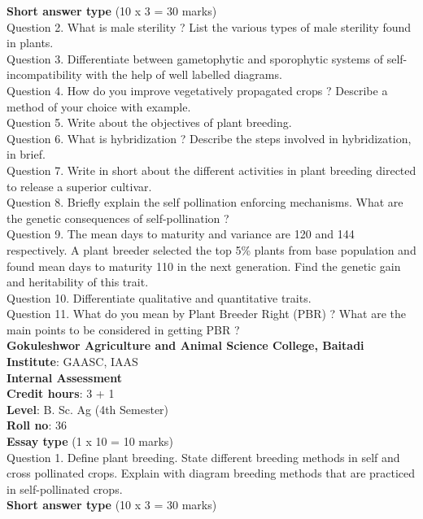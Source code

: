 \documentclass[12pt]{article}\usepackage[]{graphicx}\usepackage[]{color}
\begin{document}
\textbf{Short answer type} (10 x 3 = 30 marks) \\
Question 2. What is male sterility ? List the various types of male sterility found in plants.\\
Question 3. Differentiate between gametophytic and sporophytic systems of self-incompatibility with the help of well labelled diagrams.\\
Question 4. How do you improve vegetatively propagated crops ? Describe a method of your choice with example.\\
Question 5. Write about the objectives of plant breeding.\\
Question 6. What is hybridization ? Describe the steps involved in hybridization, in brief.\\
Question 7. Write in short about the different activities in plant breeding directed to release a superior cultivar.\\
Question 8. Briefly explain the self pollination enforcing mechanisms. What are the genetic consequences of self-pollination ?\\
Question 9. The mean days to maturity and variance are 120 and 144 respectively. A plant breeder selected the top 5\% plants from base population and found mean days to maturity 110 in the next generation. Find the genetic gain and heritability of this trait.\\
Question 10. Differentiate qualitative and quantitative traits.\\
Question 11. What do you mean by Plant Breeder Right (PBR) ? What are the main points to be considered in getting PBR ?\\
\clearpage 
{\centering \Large{\textbf{Gokuleshwor Agriculture and Animal Science College, Baitadi}} \\[0.25cm]
            \textbf{Institute}: GAASC, IAAS \\[0.2cm]
            \textbf{Internal Assessment} \\[0.2cm]} 
\textbf{Credit hours}: 3 + 1 \\ 
\textbf{Level}: B. Sc. Ag (4th Semester) \\
\textbf{Roll no}: 36 \\[0.5cm] 
\textbf{Essay type} (1 x 10 = 10 marks) \\
Question 1. Define plant breeding. State different breeding methods in self and cross pollinated crops. Explain with diagram breeding methods that are practiced in self-pollinated crops.\\
\textbf{Short answer type} (10 x 3 = 30 marks) \\
\end{document}

